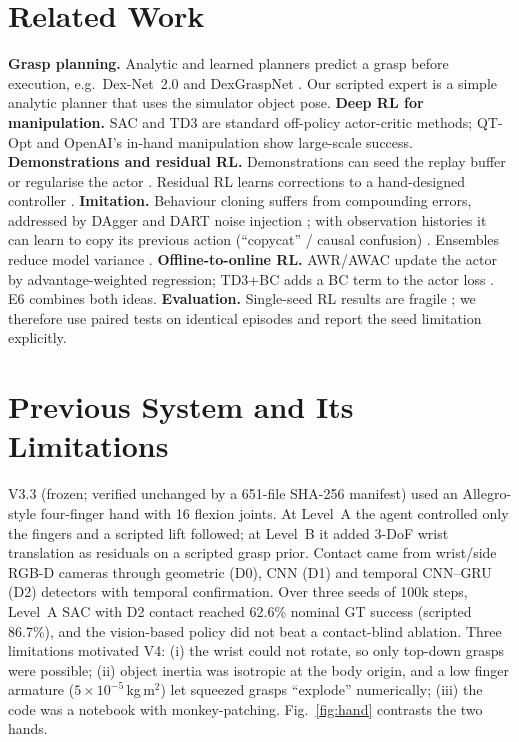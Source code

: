 \documentclass[conference,10pt]{IEEEtran}
\begin{document}
\section{Related Work}
\textbf{Grasp planning.} Analytic and learned planners predict a grasp before execution, e.g.\ Dex-Net~2.0
\cite{mahler2017dexnet} and DexGraspNet \cite{wang2023dexgraspnet}. Our scripted expert is a simple analytic planner that
uses the simulator object pose. \textbf{Deep RL for manipulation.} SAC \cite{haarnoja2018sac,haarnoja2018sacapps} and TD3
\cite{fujimoto2018td3} are standard off-policy actor-critic methods; QT-Opt \cite{kalashnikov2018qtopt} and OpenAI's in-hand
manipulation \cite{andrychowicz2020dexterous} show large-scale success. \textbf{Demonstrations and residual RL.} Demonstrations
can seed the replay buffer \cite{vecerik2017ddpgfd,nair2018overcoming} or regularise the actor \cite{rajeswaran2018dapg}.
Residual RL learns corrections to a hand-designed controller \cite{johannink2019residual,silver2018residual}.
\textbf{Imitation.} Behaviour cloning \cite{pomerleau1989alvinn} suffers from compounding errors, addressed by DAgger
\cite{ross2011dagger} and DART noise injection \cite{laskey2017dart}; with observation histories it can learn to copy its
previous action (``copycat'' / causal confusion) \cite{wen2020copycat,dehaan2019causal}. Ensembles reduce model variance
\cite{lakshminarayanan2017ensembles}. \textbf{Offline-to-online RL.} AWR/AWAC \cite{peng2019awr,nair2020awac} update the
actor by advantage-weighted regression; TD3+BC adds a BC term to the actor loss \cite{fujimoto2021td3bc}. E6 combines both
ideas. \textbf{Evaluation.} Single-seed RL results are fragile \cite{henderson2018matters,agarwal2021precipice}; we therefore
use paired tests on identical episodes and report the seed limitation explicitly.

\section{Previous System and Its Limitations}\label{sec:v33}
V3.3 (frozen; verified unchanged by a 651-file SHA-256 manifest) used an Allegro-style four-finger hand with 16 flexion
joints. At Level~A the agent controlled only the fingers and a scripted lift followed; at Level~B it added 3-DoF wrist
translation as residuals on a scripted grasp prior. Contact came from wrist/side RGB-D cameras through geometric (D0),
CNN (D1) and temporal CNN--GRU (D2) detectors with temporal confirmation. Over three seeds of 100k steps, Level~A SAC with D2
contact reached 62.6\% nominal GT success (scripted 86.7\%), and the vision-based policy did not beat a contact-blind
ablation. Three limitations motivated V4: (i) the wrist could not rotate, so only top-down grasps were possible; (ii) object
inertia was isotropic at the body origin, and a low finger armature ($5\times10^{-5}$\,kg\,m$^2$) let squeezed grasps
``explode'' numerically; (iii) the code was a notebook with monkey-patching. Fig.~\ref{fig:hand} contrasts the two hands.
\end{document}
